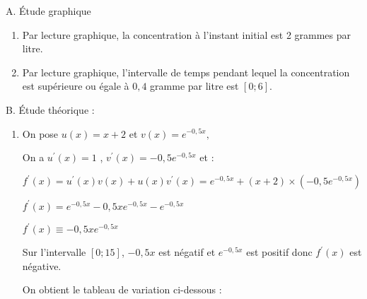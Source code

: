 \begin{corrige}
     \begin{h3}A. Étude graphique\end{h3}
     \begin{enumerate}
          \item
          Par lecture graphique, la concentration à l'instant initial est 2 grammes par litre.
          \item
          Par lecture graphique, l'intervalle de temps pendant lequel la concentration est supérieure ou égale à $0,4$ gramme par litre est $\left[0;6\right]$.
     \end{enumerate}
     \begin{h3}B. Étude théorique :\end{h3}
     \begin{enumerate}
          \item
          On pose $u\left(x\right)=x+2$ et $v\left(x\right)=e^{- 0,5x},$
          \par
          On a $u^{\prime}\left(x\right)=1$ , $v^{\prime}\left(x\right)=-0,5e^{- 0,5x}$ et :
          \par
          $f^{\prime}\left(x\right)=u^{\prime}\left(x\right)v\left(x\right)+u\left(x\right)v^{\prime}\left(x\right)=e^{- 0,5x}+\left(x+2\right)\times \left(-0,5e^{- 0,5x}\right)$
          \par
          $f^{\prime}\left(x\right)=e^{- 0,5x}-0,5xe^{- 0,5x}-e^{- 0,5x}$
          \par
          $f^{\prime}\left(x\right)\equiv -0,5xe^{- 0,5x}$
          \par
          Sur l'intervalle $\left[0 ; 15\right]$, $-0,5x$ est négatif et  $e^{- 0,5x}$ est positif donc $f^{\prime}\left(x\right)$ est négative.
          \par
          On obtient le tableau de variation ci-dessous :
\begin{center}
 \begin{extern}%
\end{extern}
\end{center}
\end{enumerate}
\end{corrige}
